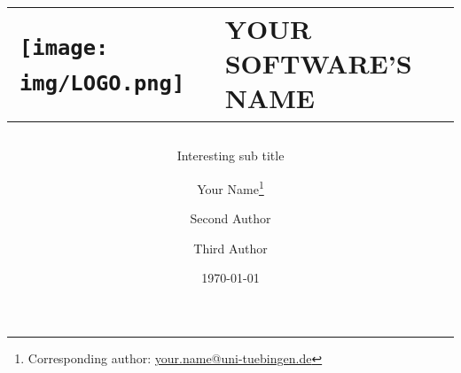 \documentclass[
  BCOR12mm,
  letterpaper,
  11pt,
  headsepline,
  pointlessnumbers,
  tablecaptionabove,
  onelinecaption,
  headinclude,
  appendixprefix,
  idxtotoc,
  bibtotoc,
  twoside,
  titlepage
]{scrreprt}
\title{
\centering
\begin{tabular}{C{5cm}L{5cm}}
\texttt{[image: img/LOGO.png]} &
YOUR SOFTWARE'S NAME \\
\end{tabular}
}
\subtitle{Interesting sub title}
\author{Your Name\thanks{Corresponding author:
\href{mailto:your.name@uni-tuebingen.de}{your.name@uni-tuebingen.de}}\and
Second Author\and Third Author}
\date{\today}
\begin{document}

\maketitle
\begin{abstract}

\end{abstract}

\setcounter{tocdepth}{1}
\tableofcontents		%

\cleardoublepage		%











\end{document}
